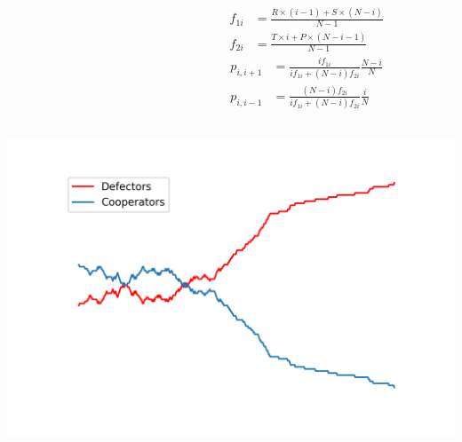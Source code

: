 \documentclass{beamer}
\begin{document}
\begin{frame}
    \begin{columns}
        \begin{column}{.5\textwidth}
            
        \end{column}
        \pause
        \begin{column}{.5\textwidth}
            \begin{align*}
                f_{1i} & = \frac{R \times (i - 1) + S \times (N - i)} {N - 1} \\
                f_{2i} & = \frac{T \times i + P \times (N - i - 1)} {N - 1}
            \end{align*}
            \pause
            \begin{align*}
                p_{i, i + 1} & = \frac{i f_{1i}} {i f_{1i} + (N - i) f_{2i}} \frac{N - i}{N}\\
                p_{i, i - 1} & = \frac{(N - i) f_{2i}} {i f_{1i} + (N - i) f_{2i}} \frac{i}{N}
            \end{align*}
        \end{column}
    \end{columns}
\end{frame}

\begin{frame}
    \centering
    \includegraphics[width=.75\textwidth]{static/moran_results.png}
\end{frame}
\end{document}
